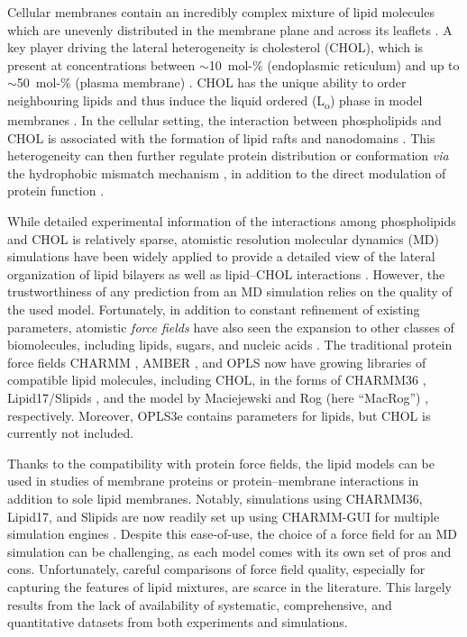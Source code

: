 \documentclass[journal=jctcce]{achemso}
\begin{document}
Cellular membranes contain an incredibly complex mixture of lipid molecules \cite{lorent2020plasma} which are unevenly distributed in the membrane plane and across its leaflets \cite{van2008membrane,wang2020membrane,kinnun2020lateral}. A key player driving the lateral heterogeneity is cholesterol (CHOL), which is present at concentrations between $\sim$10~mol-\% (endoplasmic reticulum) and up to $\sim$50~mol-\% (plasma membrane) \cite{van2008membrane}. CHOL has the unique ability to order neighbouring lipids and thus induce the liquid ordered (L\textsubscript{o}) phase in model membranes \cite{mouritsen2004s,ipsen87,kinnunen91,rog2009ordering}. In the cellular setting, the interaction between phospholipids and CHOL is associated with the formation of lipid rafts and nanodomains \cite{Simons97,cebecauer2018membrane}. This heterogeneity can then further regulate protein distribution \cite{milovanovic2015hydrophobic} or conformation \cite{kelkar2007modulation} \textit{via} the hydrophobic mismatch mechanism \cite{killian1998hydrophobic}, in addition to the direct modulation of protein function \cite{gimpl2016interaction,guixa2017membrane}.

While detailed experimental information of the interactions among phospholipids and CHOL is relatively sparse, atomistic resolution molecular dynamics (MD) simulations have been widely applied to provide a detailed view of the lateral organization of lipid bilayers as well as lipid--CHOL interactions \cite{rog14,rog2009ordering,berkowitz2009detailed}. However, the trustworthiness of any prediction from an MD simulation relies on the quality of the used model. Fortunately, in addition to constant refinement of existing parameters, atomistic \emph{force fields} have also seen the expansion to other classes of biomolecules, including lipids, sugars, and nucleic acids \cite{leonard2019developing,marrink2019computational}. The traditional protein force fields CHARMM \cite{brooks1983charmm}, AMBER \cite{cornell1995second}, and OPLS \cite{jorgensen1988opls,harder2016opls3} now have growing libraries of compatible lipid molecules, including CHOL, in the forms of CHARMM36 \cite{Klauda06,lim12}, Lipid17/Slipids \cite{dickson14,madej15,jambeck12,jambeck12b,jambeck13b,grote2020optimization}, and the model by Maciejewski and Rog (here ``MacRog'') \cite{maciejewski14,kulig14,kulig15,Kulig15b}, respectively. Moreover, OPLS3e \cite{harder2016opls3} contains parameters for lipids, but CHOL is currently not included. 

Thanks to the compatibility with protein force fields, the lipid models can be used in studies of membrane proteins or protein--membrane interactions in addition to sole lipid membranes. Notably, simulations using CHARMM36, Lipid17, and Slipids are now readily set up using CHARMM-GUI for multiple simulation engines \cite{lee16,lee2020charmm}. Despite this ease-of-use, the choice of a force field for an MD simulation can be challenging, as each model comes with its own set of pros and cons. Unfortunately, careful comparisons of force field quality, especially for capturing the features of lipid mixtures, are scarce in the literature. This largely results from the lack of availability of systematic, comprehensive, and quantitative datasets from both experiments and simulations.
\end{document}
